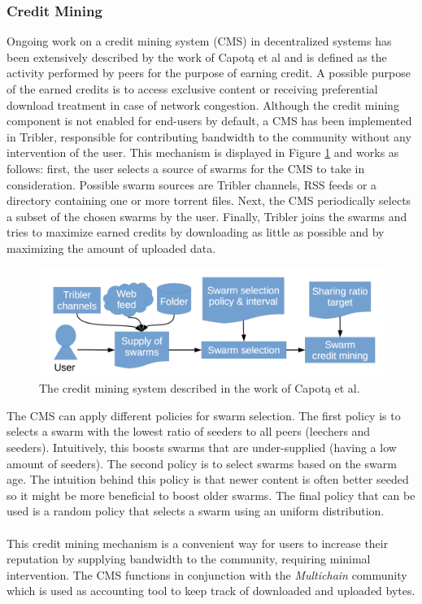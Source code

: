 \subsubsection{\textbf{Credit Mining}}
Ongoing work on a credit mining system (CMS) in decentralized systems has been extensively described by the work of Capot\k{a} et al\cite{capotka2015decentralized} and is defined as the activity performed by peers for the purpose of earning credit. A possible purpose of the earned credits is to access exclusive content or receiving preferential download treatment in case of network congestion. Although the credit mining component is not enabled for end-users by default, a CMS has been implemented in Tribler, responsible for contributing bandwidth to the community without any intervention of the user. This mechanism is displayed in Figure \ref{fig:credit-mining} and works as follows: first, the user selects a source of swarms for the CMS to take in consideration. Possible swarm sources are Tribler channels, RSS feeds or a directory containing one or more torrent files. Next, the CMS periodically selects a subset of the chosen swarms by the user. Finally, Tribler joins the swarms and tries to maximize earned credits by downloading as little as possible and by maximizing the amount of uploaded data.\\

\begin{figure}[h!]
	\centering
	\includegraphics[width=0.7\columnwidth]{images/architecture/credit_mining}
	\caption{The credit mining system described in the work of Capot\k{a} et al.\cite{capotka2015decentralized}}
	\label{fig:credit-mining}
\end{figure}

\noindent The CMS can apply different policies for swarm selection. The first policy is to selects a swarm with the lowest ratio of seeders to all peers (leechers and seeders). Intuitively, this boosts swarms that are under-supplied (having a low amount of seeders). The second policy is to select swarms based on the swarm age. The intuition behind this policy is that newer content is often better seeded so it might be more beneficial to boost older swarms. The final policy that can be used is a random policy that selects a swarm using an uniform distribution.\\\\
This credit mining mechanism is a convenient way for users to increase their reputation by supplying bandwidth to the community, requiring minimal intervention. The CMS functions in conjunction with the \emph{Multichain} community which is used as accounting tool to keep track of downloaded and uploaded bytes.

